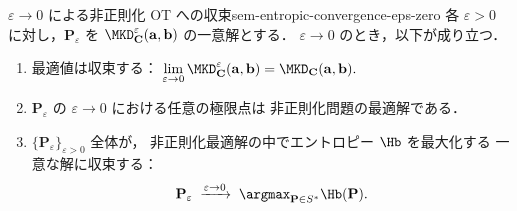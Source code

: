 \begin{theorem}{$\varepsilon \to 0$ による非正則化 OT への収束}{sem-entropic-convergence-eps-zero}
  各 $\varepsilon > 0$ に対し，$\mathbf{P}_\varepsilon$ を
  $\MKD_{\mathbf{C}}^\varepsilon(\mathbf{a}, \mathbf{b})$ の一意解とする．
  $\varepsilon \to 0$ のとき，以下が成り立つ．

  \begin{enumerate}
    \item[\textrm{(i)}]
      最適値は収束する：
      $\displaystyle
        \lim_{\varepsilon \to 0}
        \MKD_{\mathbf{C}}^\varepsilon(\mathbf{a},\mathbf{b})
        =
        \MKD_{\mathbf{C}}(\mathbf{a},\mathbf{b}).
      $
    \item[\textrm{(ii)}]
      $\mathbf{P}_\varepsilon$ の $\varepsilon \to 0$ における任意の極限点は
      非正則化問題の最適解である．
    \item[\textrm{(iii)}]
      $\{\mathbf{P}_\varepsilon\}_{\varepsilon > 0}$ 全体が，
      非正則化最適解の中でエントロピー $\Hb$ を最大化する
      一意な解に収束する：
      \[
        \mathbf{P}_\varepsilon
        \;\xrightarrow{\varepsilon \to 0}\;
        \argmax_{\mathbf{P} \in S^*} \Hb(\mathbf{P}).
      \]
  \end{enumerate}
\end{theorem}

